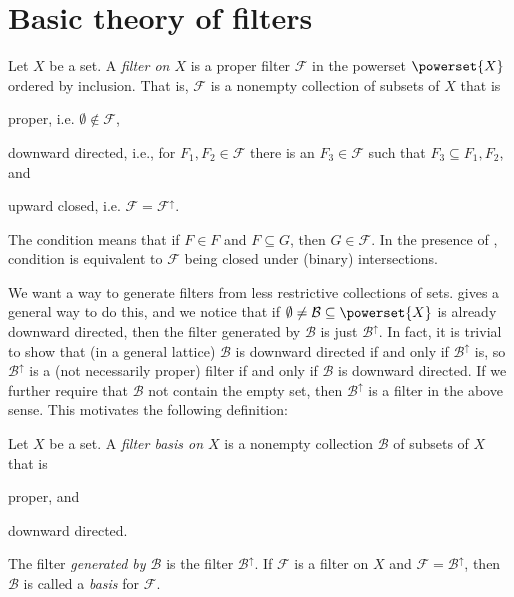 \documentclass[article, a4paper, 11pt, oneside]{memoir}
\numberwithin{equation}{chapter}
\newcommand{\calB}{\mathcal{B}}
\newcommand{\calF}{\mathcal{F}}
\theoremstyle{nonumberplain}
\begin{document}
\chapter{Basic theory of filters}

\begin{definition}[Filters]
    Let $X$ be a set. A \emph{filter on $X$} is a proper filter $\calF$ in the powerset $\powerset{X}$ ordered by inclusion. That is, $\calF$ is a nonempty collection of subsets of $X$ that is
    \begin{enumdef}
        \item \label{enum:filter-def-proper} proper, i.e. $\emptyset \not\in \calF$,
        \item \label{enum:filter-def-directed} downward directed, i.e., for $F_1, F_2 \in \calF$ there is an $F_3 \in \calF$ such that $F_3 \subseteq F_1, F_2$, and
        \item \label{enum:filter-def-closed} upward closed, i.e. $\calF = \calF^\uparrow$.
    \end{enumdef}
\end{definition}
%
The condition  means that if $F \in F$ and $F \subseteq G$, then $G \in \calF$. In the presence of , condition  is equivalent to $\calF$ being closed under (binary) intersections.

We want a way to generate filters from less restrictive collections of sets. \textcite[Exercise~2.22]{daveypriestley2002} gives a general way to do this, and we notice that if $\emptyset \neq \calB \subseteq \powerset{X}$ is already downward directed, then the filter generated by $\calB$ is just $\calB^\uparrow$. In fact, it is trivial to show that (in a general lattice) $\calB$ is downward directed if and only if $\calB^\uparrow$ is, so $\calB^\uparrow$ is a (not necessarily proper) filter if and only if $\calB$ is downward directed. If we further require that $\calB$ not contain the empty set, then $\calB^\uparrow$ is a filter in the above sense. This motivates the following definition:

\begin{definition}
    Let $X$ be a set. A \emph{filter basis on $X$} is a nonempty collection $\calB$ of subsets of $X$ that is
    \begin{enumdef}
        \item proper, and
        \item downward directed.
    \end{enumdef}
    The filter \emph{generated by $\calB$} is the filter $\calB^\uparrow$. If $\calF$ is a filter on $X$ and $\calF = \calB^\uparrow$, then $\calB$ is called a \emph{basis} for $\calF$.
\end{definition}
\end{document}
